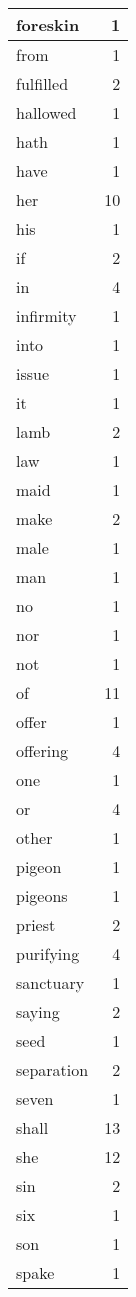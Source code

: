 \begin{center}
\begin{longtable}{l|r}
foreskin & 1 \\ \hline
from & 1 \\ \hline
fulfilled & 2 \\ \hline
hallowed & 1 \\ \hline
hath & 1 \\ \hline
have & 1 \\ \hline
her & 10 \\ \hline
his & 1 \\ \hline
if & 2 \\ \hline
in & 4 \\ \hline
infirmity & 1 \\ \hline
into & 1 \\ \hline
issue & 1 \\ \hline
it & 1 \\ \hline
lamb & 2 \\ \hline
law & 1 \\ \hline
maid & 1 \\ \hline
make & 2 \\ \hline
male & 1 \\ \hline
man & 1 \\ \hline
no & 1 \\ \hline
nor & 1 \\ \hline
not & 1 \\ \hline
of & 11 \\ \hline
offer & 1 \\ \hline
offering & 4 \\ \hline
one & 1 \\ \hline
or & 4 \\ \hline
other & 1 \\ \hline
pigeon & 1 \\ \hline
pigeons & 1 \\ \hline
priest & 2 \\ \hline
purifying & 4 \\ \hline
sanctuary & 1 \\ \hline
saying & 2 \\ \hline
seed & 1 \\ \hline
separation & 2 \\ \hline
seven & 1 \\ \hline
shall & 13 \\ \hline
she & 12 \\ \hline
sin & 2 \\ \hline
six & 1 \\ \hline
son & 1 \\ \hline
spake & 1 \\ \hline

\end{longtable}
\end{center}
